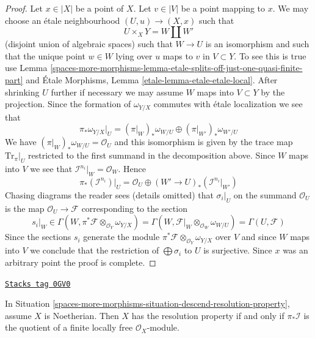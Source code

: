 \begin{proof}
\medskip\noindent
Let $x \in |X|$ be a point of $X$. Let $v \in |V|$ be a point mapping to $x$.
We may choose an \'etale neighbourhood $(U, u) \to (X, x)$ such that
$$
U \times_X Y = W \coprod W'
$$
(disjoint union of algebraic spaces) such that $W \to U$ is an
isomorphism and such that the unique point $w \in W$ lying over
$u$ maps to $v$ in $V \subset Y$. To see this is true use
Lemma \ref{spaces-more-morphisms-lemma-etale-splits-off-just-one-quasi-finite-part} and
\'Etale Morphisms, Lemma \ref{etale-lemma-etale-etale-local}.
After shrinking $U$ further if necessary we may assume $W$ maps into
$V \subset Y$ by the projection. Since the formation of $\omega_{Y/X}$
commutes with \'etale localization we see that
$$
\pi_*\omega_{Y/X}|_U = (\pi|_W)_*\omega_{W/U} \oplus (\pi|_{W'})_*\omega_{W'/U}
$$
We have $(\pi|_W)_*\omega_{W/U} = \mathcal{O}_U$ and this isomorphism
is given by the trace map $\text{Tr}_\pi|_U$ restricted
to the first summand in the decomposition above. Since $W$ maps
into $V$ we see that $\mathcal{I}^{n_i}|_W = \mathcal{O}_W$.
Hence
$$
\pi_*(\mathcal{I}^{n_i})|_U = \mathcal{O}_U \oplus
(W' \to U)_*(\mathcal{I}^{n_i}|_{W'})
$$
Chasing diagrams the reader sees (details omitted) that $\sigma_i|_U$
on the summand $\mathcal{O}_U$ is the map $\mathcal{O}_U \to \mathcal{F}$
corresponding to the section
$$
s_i|_W  \in
\Gamma(W,\pi^*\mathcal{F} \otimes_{\mathcal{O}_Y} \omega_{Y/X})
=
\Gamma(W, \mathcal{F}|_W \otimes_{\mathcal{O}_W} \omega_{W/U})
=
\Gamma(U, \mathcal{F})
$$
Since the sections $s_i$ generate the module
$\pi^*\mathcal{F} \otimes_{\mathcal{O}_Y} \omega_{Y/X}$
over $V$ and since $W$ maps into $V$ we conclude
that the restriction of $\bigoplus \sigma_i$ to $U$ is surjective.
Since $x$ was an arbitrary point the proof is complete.
\end{proof}

\begin{lemma}
\label{spaces-more-morphisms-lemma-resolution-property-in-Noetherian-case}
\href{https://stacks.math.columbia.edu/tag/0GV0}{\texttt{Stacks tag 0GV0}}

In Situation \ref{spaces-more-morphisms-situation-descend-resolution-property}, assume
$X$ is Noetherian. Then $X$ has the resolution property if and only
if $\pi_*\mathcal{I}$ is the quotient of a finite locally free
$\mathcal{O}_X$-module.
\end{lemma}

